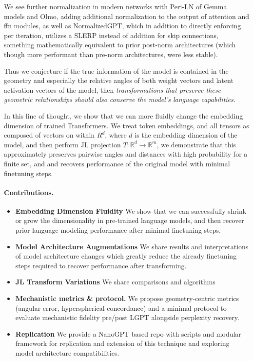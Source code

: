 \documentclass{article}
\newcommand{\R}{\mathbb{R}}
\begin{document}
We see further normalization in modern networks with Peri-LN of Gemma models and
Olmo, adding additional normalization to the output of attention and ffn
modules, as well as NormalizedGPT, which in addition to directly enforcing per
iteration, utilizes a SLERP instead of addition for skip connections, something
mathematically equivalent to prior post-norm architectures (which though more
performant than pre-norm architectures, were less stable).

Thus we conjecture if the true information of the model is contained in the
geometry and especially the relative angles of both weight vectors and latent
activation vectors of the model, then \textit{transformations that preserve
these geometric relationships should also conserve the model's language
capabilities}.

In this line of thought, we show that we can more fluidly change the embedding
dimension of trained Transformers. We treat token embeddings, and all tensors as
composed of vectors on within $R^d$, where $d$ is the embedding dimension of the
model, and then perform JL projection $T:\R^d\!\to\!\R^m$, we demonstrate that
this approximately preserves pairwise angles and distances with high probability
for a finite set, and and recovers performance of the original model with minimal
finetuning steps.

\paragraph{Contributions.}
\begin{itemize}
  \item \textbf{Embedding Dimension Fluidity} We show that we can successfully
  shrink or grow the dimensionality in pre-trained language models, and then
  recover prior language modeling performance after minimal finetuning steps.
  \item \textbf{Model Architecture Augmentations} We share results and
  interpretations of model architecture changes which greatly reduce the already
  finetuning steps required to recover performance after transforming.
  \item \textbf{JL Transform Variations} We share comparisons and algorithms
  \item \textbf{Mechanistic metrics \& protocol.} We propose geometry-centric
  metrics (angular error, hyperspherical concordance) and a minimal protocol to
  evaluate mechanistic fidelity pre/post LGPT alongside perplexity recovery.
  \item \textbf{Replication} We provide a NanoGPT based repo with scripts and
  modular framework for replication and extension of this technique and
  exploring model architecture compatibilities.
\end{itemize}
\end{document}
